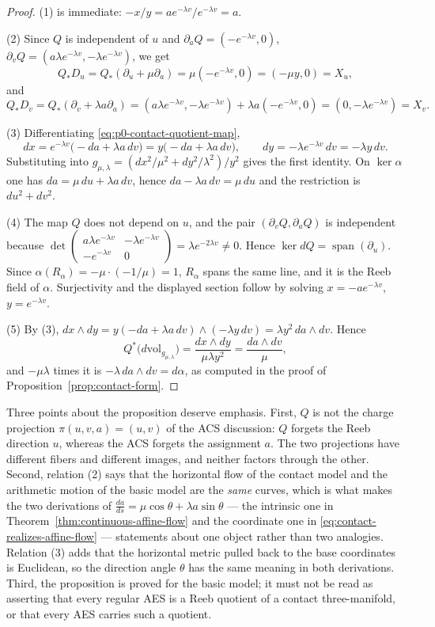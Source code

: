 \begin{proof}
(1) is immediate: $-x/y=ae^{-\lambda v}/e^{-\lambda v}=a$.

(2) Since $Q$ is independent of $u$ and $\partial_a Q=(-e^{-\lambda v},0)$,
$\partial_v Q=(a\lambda e^{-\lambda v},-\lambda e^{-\lambda v})$, we get
\[
  Q_*D_u=Q_*(\partial_u+\mu\partial_a)=\mu(-e^{-\lambda v},0)
        =(-\mu y,0)=X_u ,
\]
and
\[
  Q_*D_v=Q_*(\partial_v+\lambda a\partial_a)
        =(a\lambda e^{-\lambda v},-\lambda e^{-\lambda v})
         +\lambda a(-e^{-\lambda v},0)
        =(0,-\lambda e^{-\lambda v})=X_v .
\]

(3) Differentiating \eqref{eq:p0-contact-quotient-map},
\[
  dx=e^{-\lambda v}\bigl(-da+\lambda a\,dv\bigr)=y\bigl(-da+\lambda a\,dv\bigr),
  \qquad
  dy=-\lambda e^{-\lambda v}\,dv=-\lambda y\,dv .
\]
Substituting into $g_{\mu,\lambda}=(dx^2/\mu^2+dy^2/\lambda^2)/y^2$ gives the
first identity.  On $\ker\alpha$ one has $da=\mu\,du+\lambda a\,dv$, hence
$da-\lambda a\,dv=\mu\,du$ and the restriction is $du^2+dv^2$.

(4) The map $Q$ does not depend on $u$, and the pair
$(\partial_v Q,\partial_a Q)$ is independent because
$\det\begin{pmatrix}a\lambda e^{-\lambda v}&-\lambda e^{-\lambda v}\\
-e^{-\lambda v}&0\end{pmatrix}
=\lambda e^{-2\lambda v}\ne0$.  Hence $\ker dQ=\operatorname{span}(\partial_u)$.
Since $\alpha(R_\alpha)=-\mu\cdot(-1/\mu)=1$, $R_\alpha$ spans the same line, and
it is the Reeb field of $\alpha$.  Surjectivity and the displayed section follow
by solving $x=-ae^{-\lambda v}$, $y=e^{-\lambda v}$.

(5) By (3), $dx\wedge dy=y(-da+\lambda a\,dv)\wedge(-\lambda y\,dv)
=\lambda y^2\,da\wedge dv$.  Hence
\[
  Q^*\bigl(d\mathrm{vol}_{g_{\mu,\lambda}}\bigr)
  =\frac{dx\wedge dy}{\mu\lambda y^2}
  =\frac{da\wedge dv}{\mu},
\]
and $-\mu\lambda$ times it is $-\lambda\,da\wedge dv=d\alpha$, as computed in
the proof of Proposition~\ref{prop:contact-form}.
\end{proof}

Three points about the proposition deserve emphasis.  First, $Q$ is not the
charge projection $\pi(u,v,a)=(u,v)$ of the ACS discussion: $Q$ forgets the
Reeb direction $u$, whereas the ACS forgets the assignment $a$.  The two
projections have different fibers and different images, and neither factors
through the other.  Second, relation (2) says that the horizontal flow of the
contact model and the arithmetic motion of the basic model are the \emph{same}
curves, which is what makes the two derivations of
$\frac{da}{ds}=\mu\cos\theta+\lambda a\sin\theta$ --- the intrinsic one in
Theorem~\ref{thm:continuous-affine-flow} and the coordinate one in
\eqref{eq:contact-realizes-affine-flow} --- statements about one object rather
than two analogies.  Relation (3) adds that the horizontal metric pulled back to
the base coordinates is Euclidean, so the direction angle $\theta$ has the same
meaning in both derivations.  Third, the proposition is proved for the basic
model; it must not be read as asserting that every regular AES is a Reeb
quotient of a contact three-manifold, or that every AES carries such a
quotient.

